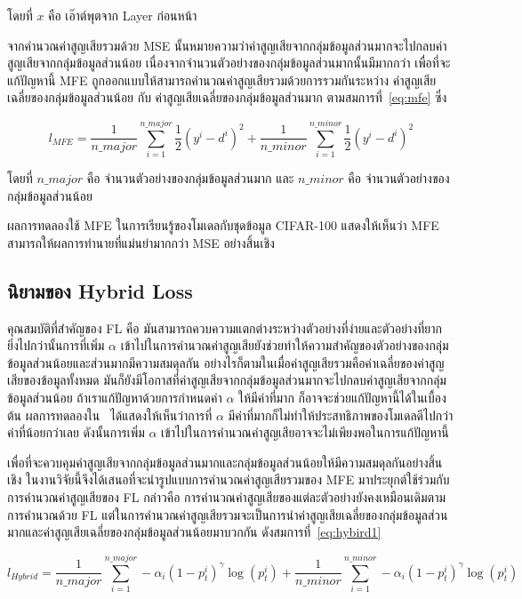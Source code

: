โดยที่ $x$ คือ เอ๊าต์พุตจาก Layer ก่อนหน้า

จากคำนวณค่าสูญเสียรวมด้วย MSE นั้นหมายความว่าค่าสูญเสียจากกลุ่มข้อมูลส่วนมากจะไปกลบค่าสูญเสียจากกลุ่มข้อมูลส่วนน้อย เนื่องจากจำนวนตัวอย่างของกลุ่มข้อมูลส่วนมากนั้นมีมากกว่า เพื่อที่จะแก้ปัญหานี้ MFE ถูกออกแบบให้สามารถคำนวณค่าสูญเสียรวมด้วยการรวมกันระหว่าง ค่าสูญเสียเฉลี่ยของกลุ่มข้อมูลส่วนน้อย กับ ค่าสูญเสียเฉลี่ยของกลุ่มข้อมูลส่วนมาก ตามสมการที่~\ref{eq:mfe} ซึ่ง

\begin{equation} \label{eq:mfe}
    l_{MFE} = \frac{1}{n\_major}\sum_{i=1}^{n\_major}\frac{1}{2}(y^{i} - d^{i})^{2} +\frac{1}{n\_minor}\sum_{i=1}^{n\_minor}\frac{1}{2}(y^{i} - d^{i})^{2}
\end{equation}

โดยที่ $n\_major$ คือ จำนวนตัวอย่างของกลุ่มข้อมูลส่วนมาก และ $n\_minor$ คือ จำนวนตัวอย่างของกลุ่มข้อมูลส่วนน้อย

ผลการทดลองใช้ MFE ในการเรียนรู้ของโมเดลกับชุดข้อมูล CIFAR-100 แสดงให้เห็นว่า MFE สามารถให้ผลการทำนายที่แม่นยำมากกว่า MSE อย่างสิ้นเชิง~\cite{Wang:2016}

\subsection{นิยามของ Hybrid Loss}
คุณสมบัติที่สำคัญของ FL คือ มันสามารถควบความแตกต่างระหว่างตัวอย่างที่ง่ายและตัวอย่างที่ยาก ยิ่งไปกว่านั้นการที่เพิ่ม $\alpha$ เข้าไปในการคำนวณค่าสูญเสียยังช่วยทำให้ความสำคัญของตัวอย่างของกลุ่มข้อมูลส่วนน้อยและส่วนมากมีความสมดุลกัน อย่างไรก็ตามในเมื่อค่าสูญเสียรวมคือค่าเฉลี่ยของค่าสูญเสียของข้อมูลทั้งหมด มันก็ยังมีโอกาสที่ค่าสูญเสียจากกลุ่มข้อมูลส่วนมากจะไปกลบค่าสูญเสียจากกลุ่มข้อมูลส่วนน้อย ถ้าเราแก้ปัญหาด้วยการกำหนดค่า $\alpha$ ให้มีค่าที่มาก ก็อาจจะช่วยแก้ปัญหานี้ได้ในเบื้องต้น ผลการทดลองใน~\cite{Lin:2017} ได้แสดงให้เห็นว่าการที่ $\alpha$ มีค่าที่มากก็ไม่ทำให้ประสทธิภาพของโมเดลดีไปกว่าค่าที่น้อยกว่าเลย ดังนั้นการเพิ่ม $\alpha$ เข้าไปในการคำนวณค่าสูญเสียอาจจะไม่เพียงพอในการแก้ปัญหานี้

เพื่อที่จะควบคุมค่าสูญเสียจากกลุ่มข้อมูลส่วนมากและกลุ่มข้อมูลส่วนน้อยให้มีความสมดุลกันอย่างสิ้นเชิง
ในงานวิจัยนี้จึงได้เสนอที่จะนำรูปแบบการคำนวณค่าสูญเสียรวมของ MFE มาประยุกต์ใช้ร่วมกับการคำนวณค่าสูญเสียของ FL กล่าวคือ การคำนวณค่าสูญเสียของแต่ละตัวอย่างยังคงเหมือนเดิมตามการคำนวณด้วย FL แต่ในการคำนวณค่าสูญเสียรวมจะเป็นการนำค่าสูญเสียเฉลี่ยของกลุ่มข้อมูลส่วนมากและค่าสูญเสียเฉลี่ยของกลุ่มข้อมูลส่วนน้อยมาบวกกัน ดังสมการที่~\ref{eq:hybird1}

\begin{equation} \label{eq:hybird1}
    l_{Hybrid} = \frac{1}{n\_major} \sum_{i = 1}^{n\_major} -\alpha_{i}(1 - p_{t}^{i})^{\gamma}\log (p_{t}^{i}) + \frac{1}{n\_minor} \sum_{i = 1}^{n\_minor} -\alpha_{i}(1 - p_{t}^{i})^{\gamma}\log (p_{t}^{i})
\end{equation}

